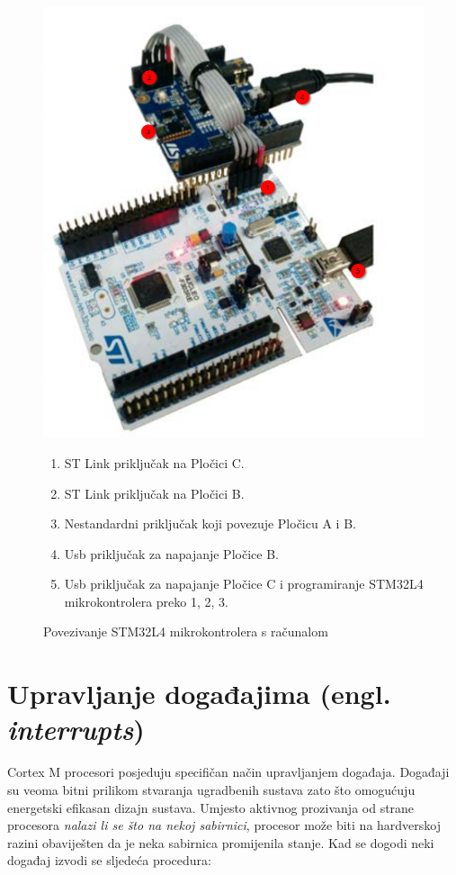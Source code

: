 \documentclass[times, utf8, diplomski]{diplomski}
\begin{document}
\begin{figure}[H]
  \includegraphics[scale=0.5]{connection_img.png}
  \centering
  \caption{Povezivanje STM32L4 mikrokontrolera s računalom \cite{gettingstartedsensor}}
  \label{fig:prog}
  \begin{enumerate}
    \item ST Link priključak na Pločici C.
    \item ST Link priključak na Pločici B.
    \item Nestandardni priključak koji povezuje Pločicu A i B.
    \item Usb priključak za napajanje Pločice B.
    \item Usb priključak za napajanje Pločice C i programiranje STM32L4 mikrokontrolera preko 1, 2, 3.
  \end{enumerate}
\end{figure}

\newpage

\section{Upravljanje događajima (engl. \textit{interrupts})}
Cortex M procesori posjeduju specifičan način upravljanjem događaja. Događaji su veoma bitni prilikom stvaranja ugradbenih sustava zato što omogućuju energetski efikasan dizajn sustava.
Umjesto aktivnog prozivanja od strane procesora \textit{nalazi li se što na nekoj sabirnici}, procesor može biti na hardverskoj razini obaviješten da je neka sabirnica promijenila stanje.
Kad se dogodi neki događaj izvodi se sljedeća procedura:
\end{document}
